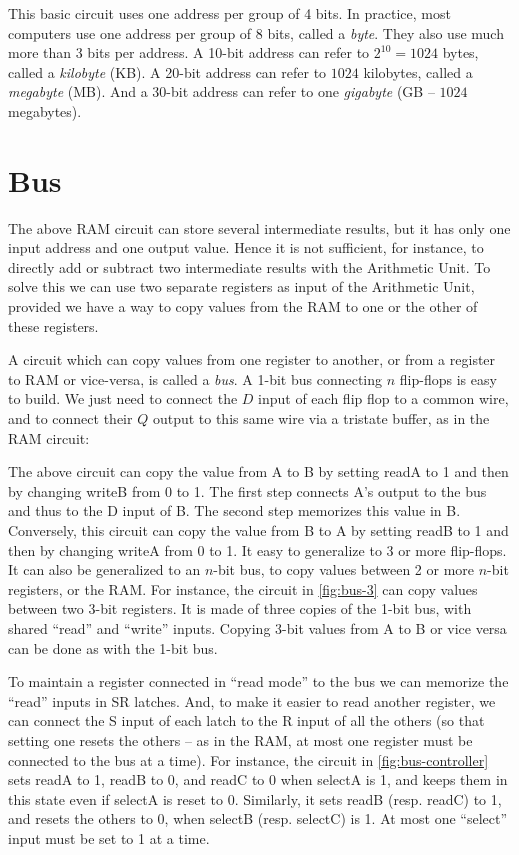 This basic circuit uses one address per group of 4 bits. In practice, most
computers use one address per group of 8 bits, called a {\em byte}. They also
use much more than 3 bits per address. A 10-bit address can refer to
$2^{10}=1024$ bytes, called a {\em kilobyte} (KB). A 20-bit address can refer
to $1024$ kilobytes, called a {\em megabyte} (MB). And a 30-bit address can
refer to one {\em gigabyte} (GB -- $1024$ megabytes).

\section{Bus}

The above RAM circuit can store several intermediate results, but it has only
one input address and one output value. Hence it is not sufficient, for
instance, to directly add or subtract two intermediate results with the
Arithmetic Unit. To solve this we can use two separate registers as input of
the Arithmetic Unit, provided we have a way to copy values from the RAM to one
or the other of these registers.

A circuit which can copy values from one register to another, or from a
register to RAM or vice-versa, is called a {\em bus}. A 1-bit bus connecting
$n$ flip-flops is easy to build. We just need to connect the $D$ input of each
flip flop to a common wire, and to connect their $Q$ output to this same wire
via a tristate buffer, as in the RAM circuit:

\begin{center}
  
\end{center}

The above circuit can copy the value from A to B by setting readA to 1 and then
by changing writeB from 0 to 1. The first step connects A's output to the bus
and thus to the D input of B. The second step memorizes this value in B.
Conversely, this circuit can copy the value from B to A by setting readB to 1
and then by changing writeA from 0 to 1. It easy to generalize to 3 or more
flip-flops. It can also be generalized to an $n$-bit bus, to copy values
between 2 or more $n$-bit registers, or the RAM. For instance, the circuit in
\cref{fig:bus-3} can copy values between two 3-bit registers. It is made of
three copies of the 1-bit bus, with shared ``read'' and ``write'' inputs.
Copying 3-bit values from A to B or vice versa can be done as with the 1-bit
bus.

To maintain a register connected in ``read mode'' to the bus we can memorize
the ``read'' inputs in SR latches. And, to make it easier to read another
register, we can connect the S input of each latch to the R input of all the
others (so that setting one resets the others -- as in the RAM, at most one
register must be connected to the bus at a time). For instance, the circuit in
\cref{fig:bus-controller} sets readA to 1, readB to 0, and readC to 0 when
selectA is 1, and keeps them in this state even if selectA is reset to 0.
Similarly, it sets readB (resp. readC) to 1, and resets the others to 0, when
selectB (resp. selectC) is 1. At most one ``select'' input must be set to 1 at
a time.


